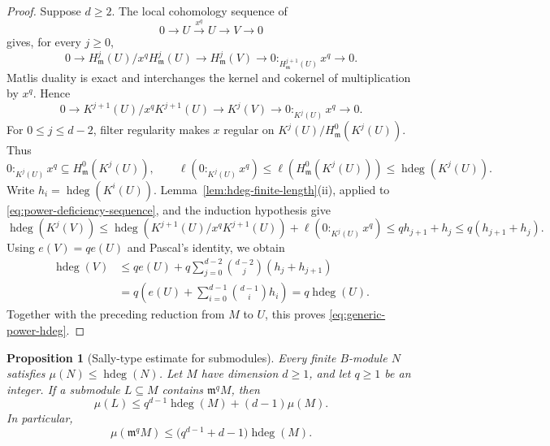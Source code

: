 \documentclass[11pt,reqno]{amsart}
\numberwithin{equation}{section}
\newtheorem{proposition}[theorem]{Proposition}
\theoremstyle{definition}
\newcommand{\m}{\mathfrak m}
\newcommand{\hdeg}{\operatorname{hdeg}}
\begin{document}
\begin{proof}
Suppose $d\ge2$. The local cohomology sequence of
\[
 0\longrightarrow U\xrightarrow{x^q}U
 \longrightarrow V\longrightarrow0
\]
gives, for every $j\ge0$,
\[
 0\longrightarrow H^j_{\m}(U)/x^qH^j_{\m}(U)
 \longrightarrow H^j_{\m}(V)
 \longrightarrow 0:_{H^{j+1}_{\m}(U)}x^q
 \longrightarrow0.
\]
Matlis duality is exact and interchanges the kernel and cokernel
of multiplication by $x^q$. Hence
\begin{equation}
 0\longrightarrow K^{j+1}(U)/x^qK^{j+1}(U)
 \longrightarrow K^j(V)
 \longrightarrow 0:_{K^j(U)}x^q\longrightarrow0.
 \label{eq:power-deficiency-sequence}
\end{equation}
For $0\le j\le d-2$, filter regularity makes $x$ regular on
$K^j(U)/H^0_{\m}(K^j(U))$. Thus
\[
 0:_{K^j(U)}x^q\subseteq H^0_{\m}(K^j(U)),\qquad
 \ell(0:_{K^j(U)}x^q)
 \le\ell(H^0_{\m}(K^j(U)))\le\hdeg(K^j(U)).
\]
Write $h_i=\hdeg(K^i(U))$.
Lemma~\ref{lem:hdeg-finite-length}\textup{(ii)}, applied to
\eqref{eq:power-deficiency-sequence}, and the induction hypothesis
give
\[
 \hdeg(K^j(V))
 \le\hdeg(K^{j+1}(U)/x^qK^{j+1}(U))
       +\ell(0:_{K^j(U)}x^q)
 \le qh_{j+1}+h_j\le q(h_{j+1}+h_j).
\]
Using $e(V)=qe(U)$ and Pascal's identity, we obtain
\[
 \begin{aligned}
 \hdeg(V)
 &\le qe(U)+q\sum_{j=0}^{d-2}\binom{d-2}{j}(h_j+h_{j+1})\\
 &=q\left(e(U)+\sum_{i=0}^{d-1}\binom{d-1}{i}h_i\right)
 =q\hdeg(U).
 \end{aligned}
\]
Together with the preceding reduction from $M$ to $U$, this proves
\eqref{eq:generic-power-hdeg}.
\end{proof}

\begin{proposition}[Sally-type estimate for submodules]
\label{prop:module-sally-bound}
Every finite $B$-module $N$ satisfies $\mu(N)\leq\hdeg(N)$.
Let $M$ have dimension $d\geq1$, and let $q\geq1$ be an integer. If a
submodule $L\subseteq M$ contains $\m^qM$, then
\begin{equation}
 \mu(L)\leq q^{d-1}\hdeg(M)+(d-1)\mu(M).
 \label{eq:module-sally-bound}
\end{equation}
In particular,
\begin{equation}
 \mu(\m^qM)\leq\bigl(q^{d-1}+d-1\bigr)\hdeg(M).
 \label{eq:module-power-generators}
\end{equation}
\end{proposition}
\end{document}
